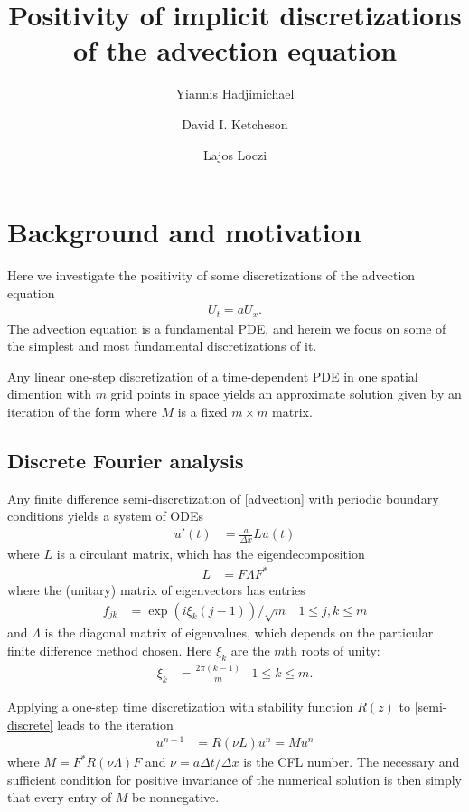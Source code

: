 \documentclass[a4paper]{article}
\title{Positivity of implicit discretizations of the advection equation}
\author{Yiannis Hadjimichael \and David I. Ketcheson \and Lajos Loczi}
\newcommand{\dt}{\Delta t}
\newcommand{\dx}{\Delta x}
\begin{document}
\maketitle

\section{Background and motivation}
Here we investigate the positivity of some discretizations of the advection equation
\begin{align} \label{advection}
U_t = a U_x.
\end{align}
The advection equation is a fundamental PDE, and herein we focus on
some of the simplest and most fundamental discretizations of it.

Any linear one-step discretization of a time-dependent PDE in one spatial
dimention with $m$ grid points in space yields an approximate solution given by
an iteration of the form
where $M$ is a fixed $m\times m$ matrix.


\subsection{Discrete Fourier analysis}
Any finite difference semi-discretization of \eqref{advection} with
periodic boundary conditions yields a system of ODEs
\begin{align} \label{semi-discrete}
    u'(t) & = \frac{a}{\dx}Lu(t)
\end{align}
where $L$ is a circulant matrix, which has the eigendecomposition
\begin{align}
    L & = F \Lambda F^*
\end{align}
where the (unitary) matrix of eigenvectors has entries
\begin{align}
    f_{jk} & = \exp(i \xi_k (j-1))/\sqrt{m}  & 1 \le j, k \le m
\end{align}
and $\Lambda$ is the diagonal matrix of eigenvalues, which depends on the
particular finite difference method chosen.  Here $\xi_k$ are the
$m$th roots of unity:
\begin{align}
    \xi_k & = \frac{2\pi(k-1)}{m} & 1 \le k \le m.
\end{align}

Applying a one-step time
discretization with stability function $R(z)$ to \eqref{semi-discrete} leads to
the iteration
\begin{align} \label{M}
    u^{n+1} & = R(\nu L) u^n = Mu^n
\end{align}
where $M=F^* R(\nu \Lambda) F$ and $\nu=a\dt/\dx$ is the CFL number.  The
necessary and sufficient condition for positive invariance of the numerical
solution is then simply that every entry of $M$ be nonnegative.
\end{document}
